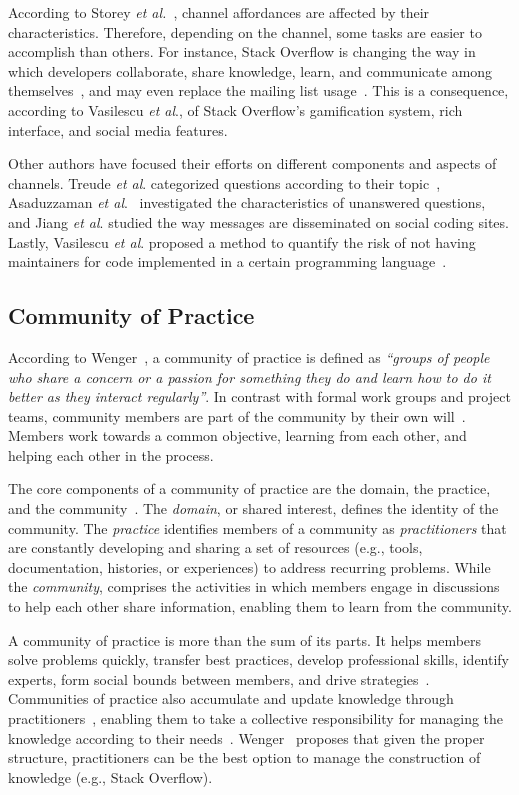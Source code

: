 \documentclass{sig-alternate-05-2015}
\begin{document}
	According to Storey \textit{et al.}~\cite{Storey2014}, channel affordances are affected by their characteristics.
	Therefore, depending on the channel, some tasks are easier to accomplish than others.
	For instance, Stack Overflow is changing the way in which developers collaborate, share knowledge, learn, and communicate among themselves~\cite{Storey2014}, and may even replace the mailing list usage~\cite{Vasilescu2014b}.
	This is a consequence, according to Vasilescu \textit{et al}., of Stack Overflow's gamification system, rich interface, and social media features.

	Other authors have focused their efforts on different components and aspects of channels.
	Treude \textit{et al}. categorized questions according to their topic~\cite{Treude2011}, 
	Asaduzzaman \textit{et al}.~\cite{Asaduzzaman2013} investigated the characteristics of unanswered questions,
	and Jiang \textit{et al}. studied the way messages are disseminated on social coding sites. 
	Lastly, Vasilescu \textit{et al}. proposed a method to quantify the risk of not having maintainers for code implemented in a certain programming language~\cite{Vasilescu2013b}.

\subsection{Community of Practice}
	According to Wenger~\cite{Wenger2000}, a community of practice is defined as \textit{``groups of people who share a concern or a passion for something they do and learn how to do it better as they interact regularly''}. 
	In contrast with formal work groups and project teams, community members are part of the community by their own will~\cite{Wenger2000}.
	Members work towards a common objective, learning from each other, and helping each other in the process.

	The core components of a community of practice are the domain, the practice, and the community~\cite{Wenger2011}.
	The \textit{domain}, or shared interest, defines the identity of the community.
	The \textit{practice} identifies members of a community as \textit{practitioners} that are constantly developing and sharing a set of resources (e.g., tools, documentation, histories, or experiences) to address recurring problems. 
	While the \textit{community}, comprises the activities in which members engage in discussions to help each other share information, enabling them to learn from the community.

	A community of practice is more than the sum of its parts.
	It helps members solve problems quickly, transfer best practices, develop professional skills, identify experts, form social bounds between members, and drive strategies~\cite{Wenger2011, Storey2014}.
	Communities of practice also accumulate and update knowledge through practitioners~\cite{Wenger2010}, enabling them to take a collective responsibility for managing the knowledge according to their needs~\cite{Wenger2011}.
	Wenger~\cite{Wenger2011} proposes that given the proper structure, practitioners can be the best option to manage the construction of knowledge (e.g., Stack Overflow). 
\end{document}
